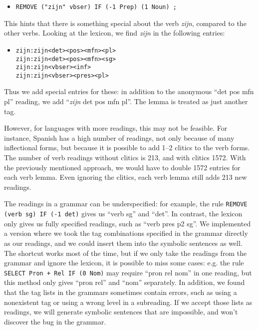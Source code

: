 \begin{itemize}
 \item[] \texttt{REMOVE ("zijn" vbser) IF (-1 Prep) (1 Noun) ;}
\end{itemize}

This hints that there is something special about the verb \emph{zijn}, compared to the other verbs. Looking at the lexicon, we find \emph{zijn} in the following entries:

\begin{itemize}
 \item[] 
\begin{verbatim}zijn:zijn<det><pos><mfn><pl>
zijn:zijn<det><pos><mfn><sg>
zijn:zijn<vbser><inf>
zijn:zijn<vbser><pres><pl>
\end{verbatim}
\end{itemize}

Thus we add special entries for these: in addition to the anonymous
``det pos mfn pl'' reading, we add ``\emph{zijn} det pos mfn pl''. 
The lemma is treated as just another tag.

 However, for languages with more readings, this may not be feasible. For instance, Spanish has a high number of readings, not only because of many inflectional forms, but because it is possible to add 1--2 clitics to the verb forms.
The number of verb readings without clitics is 213, and with clitics 1572.
With the previously mentioned approach, we would have to double 1572 entries for each verb lemma. Even ignoring the clitics, each verb lemma still adds 213 new readings.

The readings in a grammar can be underspecified: for example, the rule
\texttt{REMOVE (verb sg) IF (-1 det)} gives us ``verb sg'' and ``det''.
In contrast, the lexicon only gives us fully specified readings, such
as ``verb pres p2 sg''. We implemented a version where we took
the tag combinations specified in the grammar directly as our
readings, and we could insert them into the symbolic sentences as well.
The shortcut works most of the time, but if we only take the readings
from the grammar and ignore the lexicon, it is possible to
miss some cases: e.g. the rule \texttt{SELECT Pron + Rel IF (0 Nom)} 
may require ``pron rel nom'' in one reading, but this method only gives
``pron rel'' and ``nom'' separately. 
In addition, we found that the tag lists in the grammars sometimes
contain errors, such as using a nonexistent tag or using a wrong level
in a subreading. If we accept those lists as readings, we will
generate symbolic sentences that are impossible, and won't discover
the bug in the grammar.

